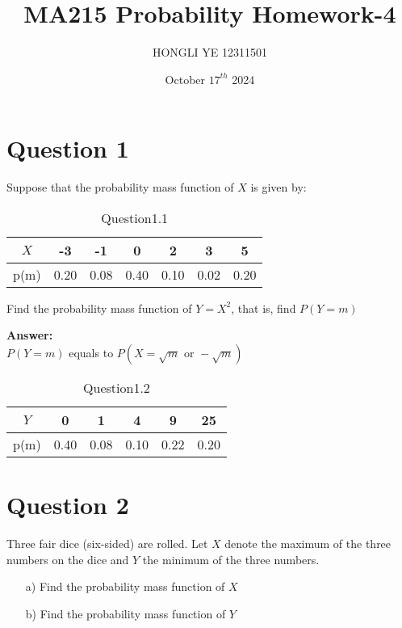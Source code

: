 \documentclass[hidelinks]{article}
\title{\textbf{MA215 Probability Homework-4}}
\author{HONGLI YE 12311501}
\date{October $17^{th}$ 2024}
\begin{document}
\hypersetup{bookmarksnumbered=true,}
\pagecolor{white}
\color{black}
\maketitle


\SetAlgoNoLine %
\SetAlgoNoEnd %

\begin{Large}
\tableofcontents
\end{Large}%
\pagebreak

\section{Question 1}
Suppose that the probability mass function of $X$ is given by:\\
\begin{table}[H]

    \centering
    \begin{tabular}{|c|c|c|c|c|c|c|}
        \hline
        $X$& -3 & -1 & 0 & 2 & 3 & 5\\ \hline
        p(m)& 0.20 & 0.08 & 0.40 & 0.10 & 0.02 & 0.20\\ \hline
    \end{tabular}
    \caption{Question1.1}
    
\end{table}
Find the probability mass function of $Y = X^2$, that is, find $P(Y = m)$

\textbf{\large Answer:}\\
$P(Y = m)$ equals to $P(X = \sqrt{m} \text{ or } -\sqrt{m})$
\begin{table}[H]
    \centering
    \begin{tabular}{|c|c|c|c|c|c|}
        \hline
        $Y$& 0 & 1 & 4 & 9 & 25\\ \hline
        p(m)& 0.40 & 0.08 & 0.10 & 0.22 & 0.20\\ \hline
    \end{tabular}
    \caption{Question1.2}
\end{table}


\section{Question 2}
Three fair dice (six-sided) are rolled. Let $X$ denote the maximum of the three numbers on the dice and $Y$ the minimum of the three numbers.
\begin{enumerate}
    \item[a)] Find the probability mass function of $X$
    \item[b)] Find the probability mass function of $Y$
\end{enumerate}
\end{document}
